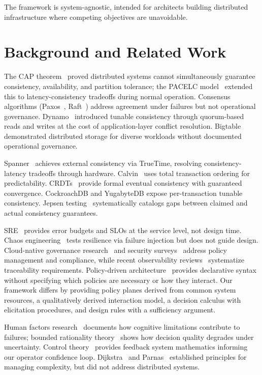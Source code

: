 \documentclass[conference]{IEEEtran}
\begin{document}
The framework is system-agnostic, intended for architects building distributed infrastructure where competing objectives are unavoidable.

\section{Background and Related Work}

The CAP theorem~\cite{brewer2000cap,gilbert2002brewer} proved distributed systems cannot simultaneously guarantee consistency, availability, and partition tolerance; the PACELC model~\cite{pacelc} extended this to latency-consistency tradeoffs during normal operation. Consensus algorithms (Paxos~\cite{lamport2001paxos}, Raft~\cite{raft}) address agreement under failures but not operational governance. Dynamo~\cite{dynamo} introduced tunable consistency through quorum-based reads and writes at the cost of application-layer conflict resolution. Bigtable~\cite{bigtable} demonstrated distributed storage for diverse workloads without documented operational governance.

Spanner~\cite{spanner} achieves external consistency via TrueTime, resolving consistency-latency tradeoffs through hardware. Calvin~\cite{calvin} uses total transaction ordering for predictability. CRDTs~\cite{crdt} provide formal eventual consistency with guaranteed convergence. CockroachDB and YugabyteDB expose per-transaction tunable consistency. Jepsen testing~\cite{jepsen} systematically catalogs gaps between claimed and actual consistency guarantees.

SRE~\cite{sre} provides error budgets and SLOs at the service level, not design time. Chaos engineering~\cite{chaos} tests resilience via failure injection but does not guide design. Cloud-native governance research~\cite{pourmajidi2025governance,cncf2023policy,cncf2023governance} and security surveys~\cite{theodoropoulos2023cloud} address policy management and compliance, while recent observability reviews~\cite{observability2026} systematize traceability requirements. Policy-driven architecture~\cite{policyarch} provides declarative syntax without specifying which policies are necessary or how they interact. Our framework differs by providing policy planes derived from common system resources, a qualitatively derived interaction model, a decision calculus with elicitation procedures, and design rules with a sufficiency argument.

Human factors research~\cite{humanfactors,leveson} documents how cognitive limitations contribute to failures; bounded rationality theory~\cite{simon} shows how decision quality degrades under uncertainty. Control theory~\cite{controltheory} provides feedback system mathematics informing our operator confidence loop. Dijkstra~\cite{dijkstra1972humble} and Parnas~\cite{parnas1972criteria} established principles for managing complexity, but did not address distributed systems.
\end{document}
